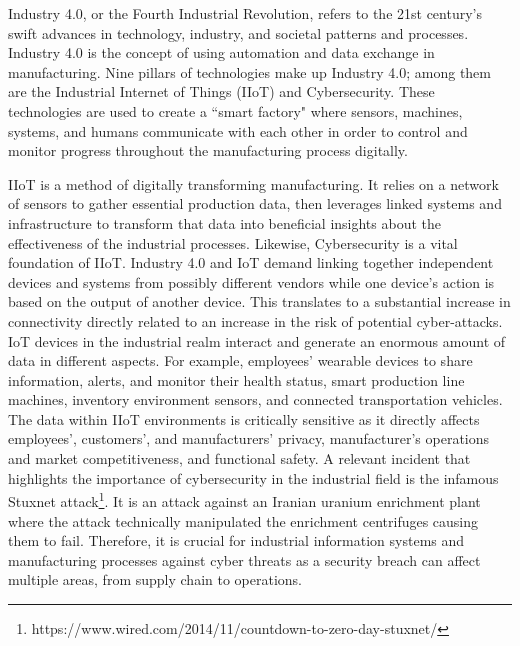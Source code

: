 Industry 4.0, or the Fourth Industrial Revolution, refers to the 21st century's swift advances in technology, industry, and societal patterns and processes. Industry 4.0 is the concept of using automation and data exchange in manufacturing. Nine pillars of technologies make up Industry 4.0; among them are the Industrial Internet of Things (IIoT) and Cybersecurity. These technologies are used to create a ``smart factory" where sensors, machines, systems, and humans communicate with each other in order to control and monitor progress throughout the manufacturing process digitally.
\par
IIoT is a method of digitally transforming manufacturing. It relies on a network of sensors to gather essential production data, then leverages linked systems and infrastructure to transform that data into beneficial insights about the effectiveness of the industrial processes. Likewise, Cybersecurity is a vital foundation of IIoT. Industry 4.0 and IoT demand linking together independent devices and systems from possibly different vendors while one device’s action is based on the output of another device. This translates to a substantial increase in connectivity directly related to an increase in the risk of potential cyber-attacks.
IoT devices in the industrial realm interact and generate an enormous amount of data in different aspects. For example, employees' wearable devices to share information, alerts, and monitor their health status, smart production line machines, inventory environment sensors, and connected transportation vehicles.	The data within IIoT environments is critically sensitive as it directly affects employees', customers', and manufacturers' privacy, manufacturer's operations and market competitiveness, and functional safety.
A relevant incident that highlights the importance of cybersecurity in the industrial field is the infamous Stuxnet attack\footnote{https://www.wired.com/2014/11/countdown-to-zero-day-stuxnet/}. It is an attack against an Iranian uranium enrichment plant where the attack technically manipulated the enrichment centrifuges causing them to fail. Therefore, it is crucial for industrial information systems and manufacturing processes against cyber threats as a security breach can affect multiple areas, from supply chain to operations.
